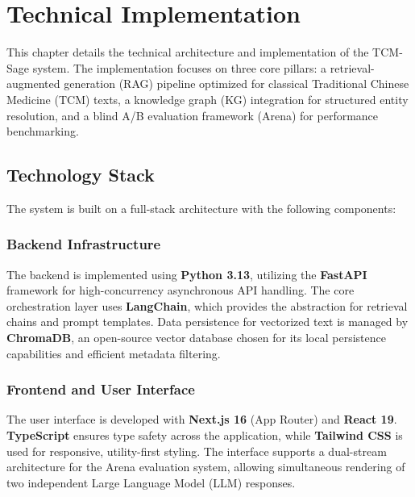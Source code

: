 \chapter{Technical Implementation}
\label{ch:implementation}

This chapter details the technical architecture and implementation of the TCM-Sage system. The implementation focuses on three core pillars: a retrieval-augmented generation (RAG) pipeline optimized for classical Traditional Chinese Medicine (TCM) texts, a knowledge graph (KG) integration for structured entity resolution, and a blind A/B evaluation framework (Arena) for performance benchmarking.

\section{Technology Stack}

The system is built on a full-stack architecture with the following components:

\subsection{Backend Infrastructure}
The backend is implemented using \textbf{Python 3.13}, utilizing the \textbf{FastAPI} framework for high-concurrency asynchronous API handling. The core orchestration layer uses \textbf{LangChain}, which provides the abstraction for retrieval chains and prompt templates. Data persistence for vectorized text is managed by \textbf{ChromaDB}, an open-source vector database chosen for its local persistence capabilities and efficient metadata filtering.

\subsection{Frontend and User Interface}
The user interface is developed with \textbf{Next.js 16} (App Router) and \textbf{React 19}. \textbf{TypeScript} ensures type safety across the application, while \textbf{Tailwind CSS} is used for responsive, utility-first styling. The interface supports a dual-stream architecture for the Arena evaluation system, allowing simultaneous rendering of two independent Large Language Model (LLM) responses.

